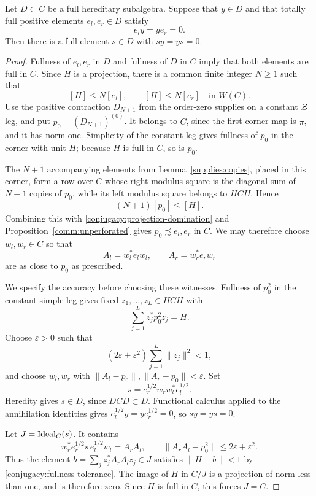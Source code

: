 \begin{proposition}\label{conjugacy:hereditary}
Let $D\subset C$ be a full hereditary subalgebra.  Suppose that
$y\in D$ and that totally full positive elements $e_l,e_r\in D$
satisfy
\[
 e_l y=ye_r=0.
\]
Then there is a full element $s\in D$ with $sy=ys=0$.
\end{proposition}

\begin{proof}
Fullness of $e_l,e_r$ in $D$ and fullness of $D$ in $C$ imply
that both elements are full in $C$.  Since $H$ is a projection,
there is a common finite integer $N\geq1$ such that
\begin{equation}\label{conjugacy:projection-domination}
 [H]\leq N[e_l],\qquad [H]\leq N[e_r]
 \quad\text{in }W(C).
\end{equation}
Use the positive contraction $D_{N+1}$ from the order-zero supplies
on a constant $\mathcal Z$ leg, and put
$p_0=(D_{N+1})^{(0)}$.  It belongs to $C$, since the first-corner
map is $\pi$, and it has norm one.  Simplicity of the constant
leg gives fullness of $p_0$ in the corner with unit $H$; because
$H$ is full in $C$, so is $p_0$.

The $N+1$ accompanying elements from Lemma~\ref{supplies:copies},
placed in this corner, form a row over $C$ whose right modulus
square is the diagonal sum of $N+1$ copies of $p_0$, while its
left modulus square belongs to $HCH$.  Hence
\[
 (N+1)[p_0]\leq[H].
\]
Combining this with \eqref{conjugacy:projection-domination} and
Proposition~\ref{comm:unperforated} gives
$p_0\precsim e_l,e_r$ in $C$.  We may therefore choose
$w_l,w_r\in C$ so that
\[
 A_l=w_l^*e_lw_l,\qquad A_r=w_r^*e_rw_r
\]
are as close to $p_0$ as prescribed.

We specify the accuracy before choosing these witnesses.
Fullness of $p_0^2$ in the constant simple leg gives fixed
$z_1,\ldots,z_L\in HCH$ with
\[
 \sum_{j=1}^L z_j^*p_0^2z_j=H.
\]
Choose $\varepsilon>0$ such that
\begin{equation}\label{conjugacy:fullness-tolerance}
 (2\varepsilon+\varepsilon^2)
       \sum_{j=1}^L\|z_j\|^2<1,
\end{equation}
and choose $w_l,w_r$ with $\|A_l-p_0\|,\|A_r-p_0\|<\varepsilon$.
Set
\[
 s=e_r^{1/2}w_rw_l^*e_l^{1/2}.
\]
Heredity gives $s\in D$, since $DCD\subset D$.
Functional calculus applied to the annihilation identities gives
$e_l^{1/2}y=ye_r^{1/2}=0$, so $sy=ys=0$.

Let $J=\operatorname{Ideal}_C(s)$.  It contains
\[
 w_r^*e_r^{1/2}s\,e_l^{1/2}w_l=A_rA_l,
 \qquad
 \|A_rA_l-p_0^2\|\leq2\varepsilon+\varepsilon^2.
\]
Thus the element $b=\sum_j z_j^*A_rA_lz_j\in J$ satisfies
$\|H-b\|<1$ by \eqref{conjugacy:fullness-tolerance}.
The image of $H$ in $C/J$ is a projection of norm less than one,
and is therefore zero.  Since $H$ is full in $C$, this forces
$J=C$.


\end{proof}
